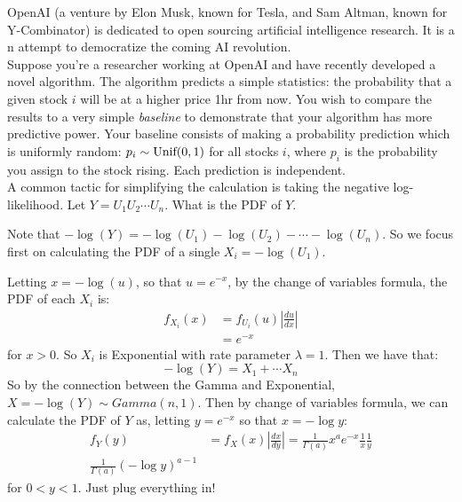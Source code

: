 \documentclass[11pt]{article}
\begin{document}
\begin{exercise}
OpenAI (a venture by Elon Musk, known for Tesla, and Sam Altman, known for Y-Combinator) is dedicated to open sourcing artificial intelligence research. It is a n attempt to democratize the coming AI revolution.\\

Suppose you're a researcher working at OpenAI and have recently developed a novel algorithm. The algorithm predicts a simple statistics: the probability that a given stock $i$ will be at a higher price 1hr from now. You wish to compare the results to a very simple \textit{baseline} to demonstrate that your algorithm has more predictive power. Your baseline consists of making a probability prediction which is uniformly random: $p_i \sim \textrm{Unif}(0,1)$ for all stocks $i$, where $p_i$ is the probability you assign to the stock rising. Each prediction is independent. \\

A common tactic for simplifying the calculation is taking the negative log-likelihood. Let $Y = U_1U_2\cdots U_n$. What is the PDF of $Y$.

\end{exercise}
\begin{solution}
Note that $-\log(Y) = -\log(U_1) - \log(U_2) - \cdots - \log(U_n)$. So we focus first on calculating the PDF of a single $X_i = -\log(U_1)$.

Letting $x = -\log(u)$, so that $u = e^{-x}$, by the change of variables formula, the PDF of each $X_i$ is:
\begin{align*}
f_{X_i}(x) &= f_{U_i}(u) \left| \frac{du}{dx} \right|  \\
&= e^{-x}
\end{align*}
for $x > 0$. So $X_i$ is Exponential with rate parameter $\lambda = 1$. Then we have that:
$$
-\log(Y) = X_1 + \cdots X_n
$$
So by the connection between the Gamma and Exponential, $X = -\log(Y) \sim Gamma(n,1)$. Then by change of variables formula, we can calculate the PDF of $Y$ as, letting $y = e^{-x}$ so that $x = -\log y$:
\begin{align*}
f_Y(y) &= f_X(x)|\frac{dx}{dy}| = \frac{1}{\Gamma(a)}x^ae^{-x}\frac{1}{x}\frac{1}{y} \\
\frac{1}{\Gamma(a)}(- \log y)^{a-1}
\end{align*}
for $0 < y < 1$. Just plug everything in!
\end{solution}
\end{document}
